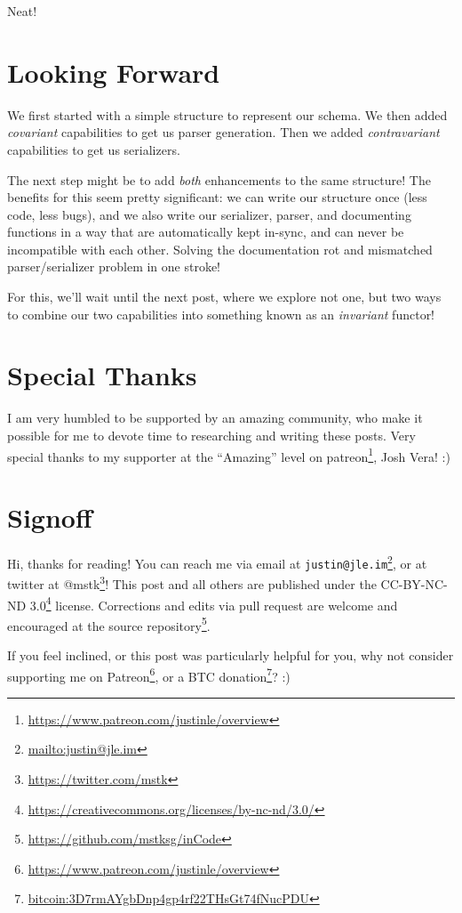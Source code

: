 \documentclass[]{article}
\renewcommand{\href}[2]{#2\footnote{\url{#1}}}
\begin{document}
Neat!

\hypertarget{looking-forward}{%
\section{Looking Forward}\label{looking-forward}}

We first started with a simple structure to represent our schema. We then added
\emph{covariant} capabilities to get us parser generation. Then we added
\emph{contravariant} capabilities to get us serializers.

The next step might be to add \emph{both} enhancements to the same structure!
The benefits for this seem pretty significant: we can write our structure once
(less code, less bugs), and we also write our serializer, parser, and
documenting functions in a way that are automatically kept in-sync, and can
never be incompatible with each other. Solving the documentation rot and
mismatched parser/serializer problem in one stroke!

For this, we'll wait until the next post, where we explore not one, but two ways
to combine our two capabilities into something known as an \emph{invariant}
functor!

\hypertarget{special-thanks}{%
\section{Special Thanks}\label{special-thanks}}

I am very humbled to be supported by an amazing community, who make it possible
for me to devote time to researching and writing these posts. Very special
thanks to my supporter at the ``Amazing'' level on
\href{https://www.patreon.com/justinle/overview}{patreon}, Josh Vera! :)

\hypertarget{signoff}{%
\section{Signoff}\label{signoff}}

Hi, thanks for reading! You can reach me via email at
\href{mailto:justin@jle.im}{\nolinkurl{justin@jle.im}}, or at twitter at
\href{https://twitter.com/mstk}{@mstk}! This post and all others are published
under the \href{https://creativecommons.org/licenses/by-nc-nd/3.0/}{CC-BY-NC-ND
3.0} license. Corrections and edits via pull request are welcome and encouraged
at \href{https://github.com/mstksg/inCode}{the source repository}.

If you feel inclined, or this post was particularly helpful for you, why not
consider \href{https://www.patreon.com/justinle/overview}{supporting me on
Patreon}, or a \href{bitcoin:3D7rmAYgbDnp4gp4rf22THsGt74fNucPDU}{BTC donation}?
:)
\end{document}
